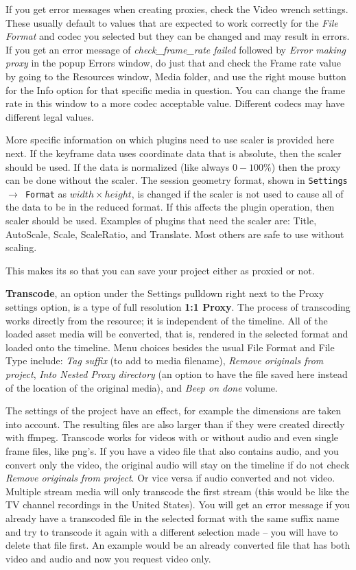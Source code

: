 If you get error messages when creating proxies, check the Video wrench settings.  These usually default to values that are expected to work correctly for the \textit{File Format} and codec you selected but they can be changed and may result in errors.  If you get an error message of \textit{check\_frame\_rate failed} followed by \textit{Error making proxy} in the popup Errors window, do just that and check the Frame rate value by going to the Resources window, Media folder, and use the right mouse button for the Info option for that specific media in question.  You can change the frame rate in this window to a more codec acceptable value.  Different codecs may have different legal values.

More specific information on which plugins need to use scaler is provided here next.  If the keyframe data uses coordinate data that is absolute, then the scaler should be used.  If the data is normalized (like always $0-100\%$) then the proxy can be done without the scaler.  The session geometry format, shown in \texttt{Settings $\rightarrow$ Format} as $width \times height$, is changed if the scaler is not used to cause all of the data to be in the reduced format.  If this affects the plugin operation, then scaler should be used.  Examples of plugins that need the scaler are: Title, AutoScale, Scale, ScaleRatio, and Translate.  Most others are safe to use without scaling.

 This makes its so that you can save your project
either as proxied or not.

\textbf{Transcode}, an option under the Settings pulldown right next to the Proxy settings option, is a type of full resolution \textbf{1:1 Proxy}.
The process of transcoding works directly from the resource; it is independent of the timeline. 
All of the loaded asset media will be converted, that is, rendered in the selected format and loaded onto the timeline. 
Menu choices besides the usual File Format and File Type include: \textit{Tag suffix} (to add to media filename), \textit{Remove originals from project}, \textit{Into Nested Proxy directory} (an option to have the file saved here instead of the location of the original media), and \textit{Beep on done} volume.

The settings of the project have an effect, for example the dimensions are taken into account. The resulting files are also larger than if they were created directly with ffmpeg.
Transcode works for videos with or without audio and even single frame files, like png's.
If you have a video file that also contains audio, and you convert only the video, the original audio will stay on the timeline if do not check \textit{Remove originals from project}. Or vice versa if audio converted and not video.
Multiple stream media will only transcode the first stream (this would be like the TV channel recordings in the United States).
You will get an error message if you already have a transcoded file in the selected format with the same suffix name and try to transcode it again with a different selection made -- you will have to delete that file first. An example would be
an already converted file that has both video and audio and now you request video only. 

